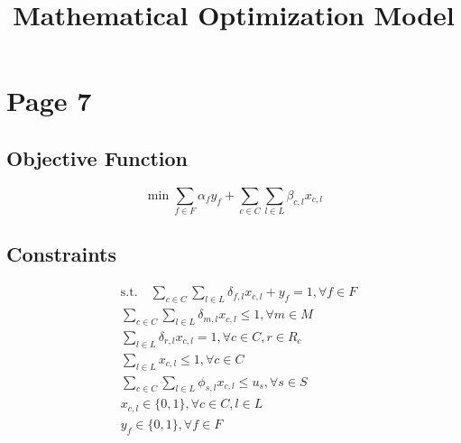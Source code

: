 \documentclass{article}
\title{Mathematical Optimization Model}
\author{}
\date{}
\begin{document}
\maketitle

\section{Page 7}

\subsection{Objective Function}
\begin{equation}
\min \sum_{f\in F}\alpha_f y_f + \sum_{c\in C}\sum_{l\in L}\beta_{c,l}x_{c,l} \tag{1}
\end{equation}

\subsection{Constraints}
\begin{align}
& \text{s.t.} \quad \sum_{c\in C}\sum_{l\in L}\delta_{f,l}x_{c,l} + y_f = 1, \forall f \in F \tag{2} \\
& \sum_{c\in C}\sum_{l\in L}\delta_{m,l}x_{c,l} \leq 1, \forall m \in M \tag{3} \\
& \sum_{l\in L}\delta_{r,l}x_{c,l} = 1, \forall c \in C, r \in R_c \tag{4} \\
& \sum_{l\in L}x_{c,l} \leq 1, \forall c \in C \tag{5} \\
& \sum_{c\in C}\sum_{l\in L}\phi_{s,l}x_{c,l} \leq u_s, \forall s \in S \tag{6} \\
& x_{c,l} \in \{0, 1\}, \forall c \in C, l \in L \tag{7} \\
& y_f \in \{0, 1\}, \forall f \in F \tag{8}
\end{align}
\end{document}
